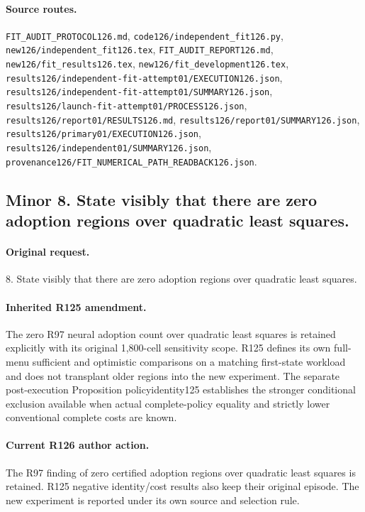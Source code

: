 \paragraph{Source routes.} \nolinkurl{FIT_AUDIT_PROTOCOL126.md}, \nolinkurl{code126/independent_fit126.py}, \nolinkurl{new126/independent_fit126.tex}, \nolinkurl{FIT_AUDIT_REPORT126.md}, \nolinkurl{new126/fit_results126.tex}, \nolinkurl{new126/fit_development126.tex}, \nolinkurl{results126/independent-fit-attempt01/EXECUTION126.json}, \nolinkurl{results126/independent-fit-attempt01/SUMMARY126.json}, \nolinkurl{results126/launch-fit-attempt01/PROCESS126.json}, \nolinkurl{results126/report01/RESULTS126.md}, \nolinkurl{results126/report01/SUMMARY126.json}, \nolinkurl{results126/primary01/EXECUTION126.json}, \nolinkurl{results126/independent01/SUMMARY126.json}, \nolinkurl{provenance126/FIT_NUMERICAL_PATH_READBACK126.json}.

\subsection*{Minor 8. State visibly that there are zero adoption regions over quadratic least squares.}
\paragraph{Original request.} 8. State visibly that there are zero adoption regions over quadratic least squares.

\paragraph{Inherited R125 amendment.} The zero R97 neural adoption count over quadratic least squares is retained explicitly with its original 1,800-cell sensitivity scope. R125 defines its own full-menu sufficient and optimistic comparisons on a matching first-state workload and does not transplant older regions into the new experiment. The separate post-execution Proposition policyidentity125 establishes the stronger conditional exclusion available when actual complete-policy equality and strictly lower conventional complete costs are known.

\paragraph{Current R126 author action.} The R97 finding of zero certified adoption regions over quadratic least squares is retained. R125 negative identity/cost results also keep their original episode. The new experiment is reported under its own source and selection rule.

